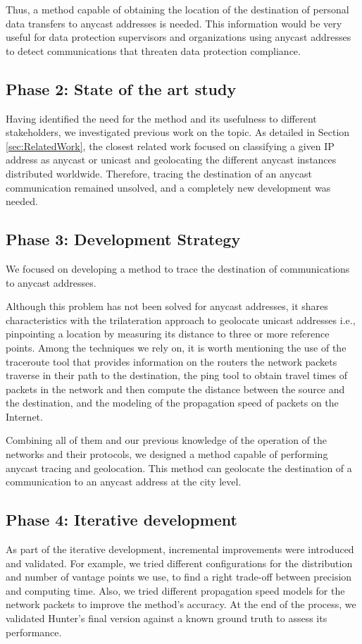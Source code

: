 \documentclass[preprint,12pt]{elsarticle}
\begin{document}
Thus, a method capable of obtaining the location of the destination of personal data transfers to anycast addresses is needed. This information would be very useful for data protection supervisors and organizations using anycast addresses to detect communications that threaten data protection compliance.

\subsection{Phase 2: State of the art study}
Having identified the need for the method and its usefulness to different stakeholders, we investigated previous work on the topic. As detailed in Section \ref{sec:RelatedWork}, the closest related work focused on classifying a given IP address as anycast or unicast and geolocating the different anycast instances distributed worldwide. Therefore, tracing the destination of an anycast communication remained unsolved, and a completely new development was needed.

\subsection{Phase 3: Development Strategy}
We focused on developing a method to trace the destination of communications to anycast addresses.

Although this problem has not been solved for anycast addresses, it shares characteristics with the trilateration approach to geolocate unicast addresses \cite{Dan2021IPInterpolation, Ciavarrini2018GeolocationBound, Kohls2022VerLoc:Systems} i.e., pinpointing a location by measuring its distance to three or more reference points. Among the techniques we rely on, it is worth mentioning the use of the traceroute tool that provides information on the routers the network packets traverse in their path to the destination, the ping tool to obtain travel times of packets in the network and then compute the distance between the source and the destination, and the modeling of the propagation speed of packets on the Internet.

Combining all of them and our previous knowledge of the operation of the networks and their protocols, we designed a method capable of performing anycast tracing and geolocation. This method can geolocate the destination of a communication to an anycast address at the city level.

\subsection{Phase 4: Iterative development}
As part of the iterative development, incremental improvements were introduced and validated. For example, we tried different configurations for the distribution and number of vantage points we use, to find a right trade-off between precision and computing time. Also, we tried different propagation speed models for the network packets to improve the method's accuracy. At the end of the process, we validated Hunter's final version against a known ground truth to assess its performance.
\end{document}
